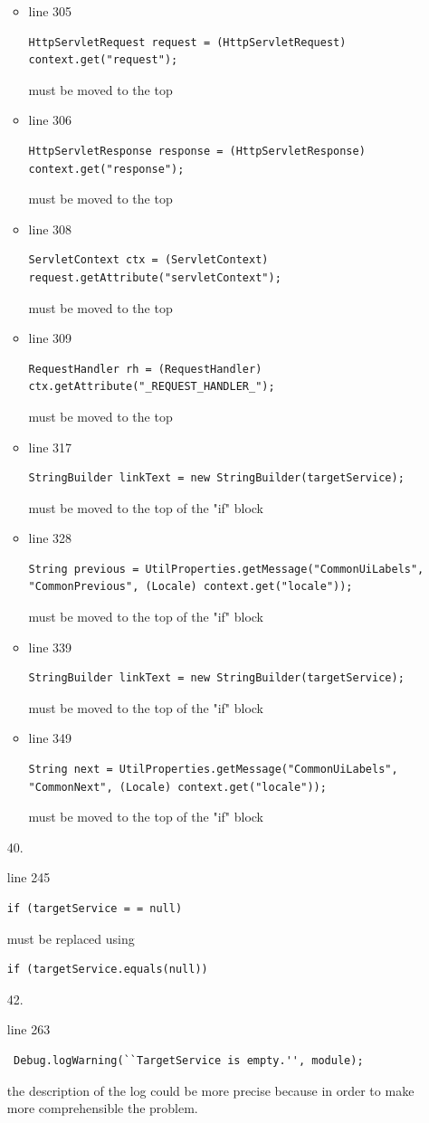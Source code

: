 \documentclass[english]{article}
\begin{document}
\begin{itemize}
{\begin{itemize}
				\item{line 305
						\begin{lstlisting}
HttpServletRequest request = (HttpServletRequest) context.get("request");
						\end{lstlisting} must be moved to the top}
				\item{line 306
						\begin{lstlisting}
HttpServletResponse response = (HttpServletResponse) context.get("response");
						\end{lstlisting} must be moved to the top}
				\item{line 308
						\begin{lstlisting}
ServletContext ctx = (ServletContext) request.getAttribute("servletContext");
						\end{lstlisting} must be moved to the top}
				\item{line 309
						\begin{lstlisting}
RequestHandler rh = (RequestHandler) ctx.getAttribute("_REQUEST_HANDLER_");
						\end{lstlisting} must be moved to the top}
				\item{line 317
						\begin{lstlisting}
StringBuilder linkText = new StringBuilder(targetService);
						\end{lstlisting} must be moved to the top of the "if" block}
				\item{line 328
						\begin{lstlisting}
String previous = UtilProperties.getMessage("CommonUiLabels", "CommonPrevious", (Locale) context.get("locale"));
						\end{lstlisting} must be moved to the top of the "if" block}
				\item{line 339
						\begin{lstlisting}
StringBuilder linkText = new StringBuilder(targetService);
						\end{lstlisting} must be moved to the top of the "if" block}
				\item{line 349
						\begin{lstlisting}
String next = UtilProperties.getMessage("CommonUiLabels", "CommonNext", (Locale) context.get("locale"));
						\end{lstlisting} must be moved to the top of the "if" block}
			\end{itemize}
		}
	\item[40.]{ line 245 
		\begin{lstlisting}
if (targetService = = null) 
		\end{lstlisting} must be replaced using
		\begin{lstlisting}
if (targetService.equals(null))
		\end{lstlisting}}
	
	
	 \item[42.]{line 263
		\begin{lstlisting} 
 Debug.logWarning(``TargetService is empty.'', module);
		\end{lstlisting}
		the description of the log could be more precise because in order to make more comprehensible the problem.}
\end{itemize}
\end{document}
